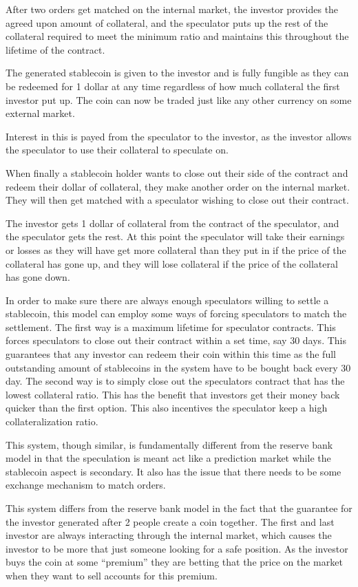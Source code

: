\documentclass[english,]{IEEEtran}
\begin{document}
After two orders get matched on the internal market, the investor
provides the agreed upon amount of collateral, and the speculator puts
up the rest of the collateral required to meet the minimum ratio and
maintains this throughout the lifetime of the contract.

The generated stablecoin is given to the investor and is fully fungible
as they can be redeemed for 1 dollar at any time regardless of how much
collateral the first investor put up. The coin can now be traded just
like any other currency on some external market.

Interest in this is payed from the speculator to the investor, as the
investor allows the speculator to use their collateral to speculate on.

When finally a stablecoin holder wants to close out their side of the
contract and redeem their dollar of collateral, they make another order
on the internal market. They will then get matched with a speculator
wishing to close out their contract.

The investor gets 1 dollar of collateral from the contract of the
speculator, and the speculator gets the rest. At this point the
speculator will take their earnings or losses as they will have get more
collateral than they put in if the price of the collateral has gone up,
and they will lose collateral if the price of the collateral has gone
down.

In order to make sure there are always enough speculators willing to
settle a stablecoin, this model can employ some ways of forcing
speculators to match the settlement. The first way is a maximum lifetime
for speculator contracts. This forces speculators to close out their
contract within a set time, say 30 days. This guarantees that any
investor can redeem their coin within this time as the full outstanding
amount of stablecoins in the system have to be bought back every 30 day.
The second way is to simply close out the speculators contract that has
the lowest collateral ratio. This has the benefit that investors get
their money back quicker than the first option. This also incentives the
speculator keep a high collateralization ratio.

This system, though similar, is fundamentally different from the reserve
bank model in that the speculation is meant act like a prediction market
while the stablecoin aspect is secondary. It also has the issue that
there needs to be some exchange mechanism to match orders.

This system differs from the reserve bank model in the fact that the
guarantee for the investor generated after 2 people create a coin
together. The first and last investor are always interacting through the
internal market, which causes the investor to be more that just someone
looking for a safe position. As the investor buys the coin at some
``premium'' they are betting that the price on the market when they want
to sell accounts for this premium.
\end{document}
